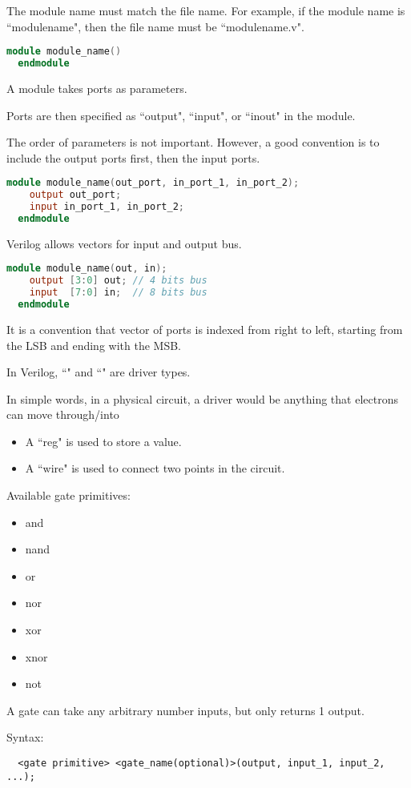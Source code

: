   \par The module name must match the file name. For example, if the module name
    is ``module\textunderscore name", then the file name must be
    ``module\textunderscore name.v".
\begin{lstlisting}[language=Verilog]
  module module_name()
  endmodule
\end{lstlisting}

  \par A module takes ports as parameters.
  \par Ports are then specified as ``output", ``input", or ``inout" in the
    module.
  \par The order of parameters is not important. However, a good convention is
    to include the output ports first, then the input ports.
\begin{lstlisting}[language=Verilog]
  module module_name(out_port, in_port_1, in_port_2);
    output out_port;
    input in_port_1, in_port_2;
  endmodule
\end{lstlisting}

  \par Verilog allows vectors for input and output bus.
\begin{lstlisting}[language=Verilog]
  module module_name(out, in);
    output [3:0] out; // 4 bits bus
    input  [7:0] in;  // 8 bits bus
  endmodule
\end{lstlisting}
  \par It is a convention that vector of ports is indexed from right to left,
    starting from the LSB and ending with the MSB.

  \par In Verilog, ``" and ``" are driver types.
  \par In simple words, in a physical circuit, a driver would be anything that
    electrons can move through/into
  \begin{itemize}
    \item A ``reg" is used to store a value.
    \item A ``wire" is used to connect two points in the circuit.
  \end{itemize}

  \par Available gate primitives:
  \begin{itemize}
    \item and
    \item nand
    \item or
    \item nor
    \item xor
    \item xnor
    \item not
  \end{itemize}
  \par A gate can take any arbitrary number inputs, but only returns 1 output.
  \par Syntax:
\begin{lstlisting}
  <gate primitive> <gate_name(optional)>(output, input_1, input_2, ...);
\end{lstlisting}

